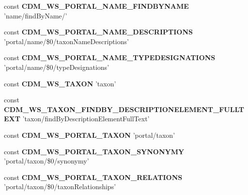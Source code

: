 \begin{DoxyCompactItemize}
\item 
\hypertarget{webservice__uris_8php_aa4de1a8cba11277da4c6eef0164d8408}{const {\bfseries C\-D\-M\-\_\-\-W\-S\-\_\-\-P\-O\-R\-T\-A\-L\-\_\-\-N\-A\-M\-E\-\_\-\-F\-I\-N\-D\-B\-Y\-N\-A\-M\-E} 'name/find\-By\-Name/'}\label{webservice__uris_8php_aa4de1a8cba11277da4c6eef0164d8408}

\item 
\hypertarget{webservice__uris_8php_a7d5c987bc4be87b16f7155c35b484f7c}{const {\bfseries C\-D\-M\-\_\-\-W\-S\-\_\-\-P\-O\-R\-T\-A\-L\-\_\-\-N\-A\-M\-E\-\_\-\-D\-E\-S\-C\-R\-I\-P\-T\-I\-O\-N\-S} 'portal/name/\$0/taxon\-Name\-Descriptions'}\label{webservice__uris_8php_a7d5c987bc4be87b16f7155c35b484f7c}

\item 
\hypertarget{webservice__uris_8php_a91621975ad4be4f866dc62fcaf5f5315}{const {\bfseries C\-D\-M\-\_\-\-W\-S\-\_\-\-P\-O\-R\-T\-A\-L\-\_\-\-N\-A\-M\-E\-\_\-\-T\-Y\-P\-E\-D\-E\-S\-I\-G\-N\-A\-T\-I\-O\-N\-S} 'portal/name/\$0/type\-Designations'}\label{webservice__uris_8php_a91621975ad4be4f866dc62fcaf5f5315}

\item 
\hypertarget{webservice__uris_8php_a2d218b2d76dcab4cd99ca3de78aef1aa}{const {\bfseries C\-D\-M\-\_\-\-W\-S\-\_\-\-T\-A\-X\-O\-N} 'taxon'}\label{webservice__uris_8php_a2d218b2d76dcab4cd99ca3de78aef1aa}

\item 
\hypertarget{webservice__uris_8php_ab4f69fdf2ae96b60db6686891ae49e2c}{const {\bfseries C\-D\-M\-\_\-\-W\-S\-\_\-\-T\-A\-X\-O\-N\-\_\-\-F\-I\-N\-D\-B\-Y\-\_\-\-D\-E\-S\-C\-R\-I\-P\-T\-I\-O\-N\-E\-L\-E\-M\-E\-N\-T\-\_\-\-F\-U\-L\-L\-T\-E\-X\-T} 'taxon/find\-By\-Description\-Element\-Full\-Text'}\label{webservice__uris_8php_ab4f69fdf2ae96b60db6686891ae49e2c}

\item 
\hypertarget{webservice__uris_8php_ade7eb52ba0bcafe5b0664e894280796b}{const {\bfseries C\-D\-M\-\_\-\-W\-S\-\_\-\-P\-O\-R\-T\-A\-L\-\_\-\-T\-A\-X\-O\-N} 'portal/taxon'}\label{webservice__uris_8php_ade7eb52ba0bcafe5b0664e894280796b}

\item 
\hypertarget{webservice__uris_8php_a769f5be792d19d5f575600b03c41c087}{const {\bfseries C\-D\-M\-\_\-\-W\-S\-\_\-\-P\-O\-R\-T\-A\-L\-\_\-\-T\-A\-X\-O\-N\-\_\-\-S\-Y\-N\-O\-N\-Y\-M\-Y} 'portal/taxon/\$0/synonymy'}\label{webservice__uris_8php_a769f5be792d19d5f575600b03c41c087}

\item 
\hypertarget{webservice__uris_8php_a2092b2297c68d81a0ae79bfb8e3b1a47}{const {\bfseries C\-D\-M\-\_\-\-W\-S\-\_\-\-P\-O\-R\-T\-A\-L\-\_\-\-T\-A\-X\-O\-N\-\_\-\-R\-E\-L\-A\-T\-I\-O\-N\-S} 'portal/taxon/\$0/taxon\-Relationships'}\label{webservice__uris_8php_a2092b2297c68d81a0ae79bfb8e3b1a47}


\end{DoxyCompactItemize}
